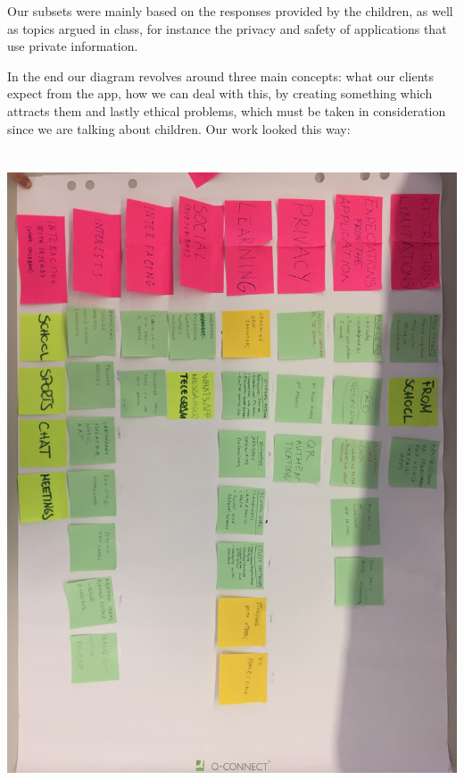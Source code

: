 \documentclass[12pt]{report}
\begin{document}
	Our subsets were mainly based on the responses provided by the children,
	as well as topics argued in class, for instance the privacy and safety of
	applications that use private information.

	In the end our diagram revolves around three main concepts:
	what our clients expect from the app, how we can deal with this, by creating something which attracts them
	and lastly ethical problems, which must be taken in consideration since we are talking about
	children. Our work looked this way: \\\\\\
	\includegraphics[width = 1.0\linewidth]{affinity_diagram.jpg}\break
\end{document}
